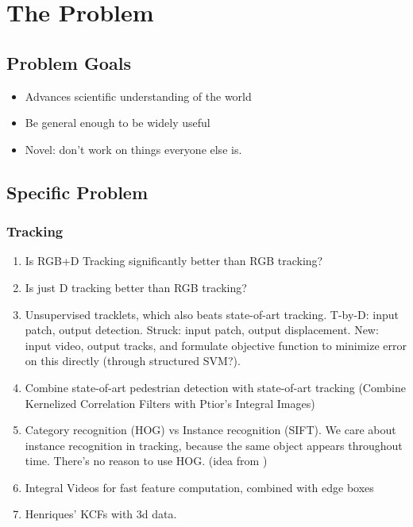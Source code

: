 \chapter{The Problem}

\section{Problem Goals}
\begin{itemize}
\item Advances scientific understanding of the world
\item Be general enough to be widely useful
\item Novel: don't work on things everyone else is.
\end{itemize}

\section{Specific Problem}

\subsection{Tracking}
\begin{enumerate}
\item Is RGB+D Tracking significantly better than RGB tracking?
\item Is just D tracking better than RGB tracking?
\item Unsupervised tracklets, which also beats state-of-art tracking. T-by-D: input patch, output detection. Struck: input patch, output displacement. New: input video, output tracks, and formulate objective function to minimize error on this directly (through structured SVM?).
\item Combine state-of-art pedestrian detection with state-of-art tracking (Combine Kernelized Correlation Filters with Ptior's Integral Images)
\item Category recognition (HOG) vs Instance recognition (SIFT). We care about instance recognition in tracking, because the same object appears throughout time. There's no reason to use HOG. (idea from \cite{breitenstein2009robust})
\item Integral Videos for fast feature computation, combined with edge boxes
\item Henriques' KCFs with 3d data.
\end{enumerate}

